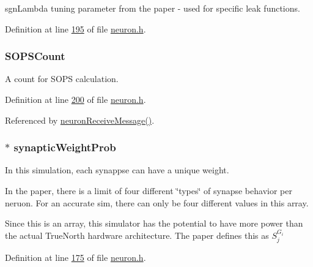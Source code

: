 sgn\+Lambda tuning parameter from the paper -\/ used for specific leak functions. 



Definition at line \hyperlink{neuron_8h_source_l00195}{195} of file \hyperlink{neuron_8h_source}{neuron.\+h}.

\hypertarget{structneuron_state_a71fbb9a79e8048b473b6e09d29a64bbe}{}
\subsubsection[{S\+O\+P\+S\+Count}]{ S\+O\+P\+S\+Count}\label{structneuron_state_a71fbb9a79e8048b473b6e09d29a64bbe}


A count for S\+O\+P\+S calculation. 



Definition at line \hyperlink{neuron_8h_source_l00200}{200} of file \hyperlink{neuron_8h_source}{neuron.\+h}.



Referenced by \hyperlink{neuron_8c_source_l00104}{neuron\+Receive\+Message()}.

\hypertarget{structneuron_state_af499000d57eeeaeeb6ee0928e1eee4f7}{}
\subsubsection[{synaptic\+Weight\+Prob}]{$\ast$ synaptic\+Weight\+Prob}\label{structneuron_state_af499000d57eeeaeeb6ee0928e1eee4f7}


In this simulation, each synappse can have a unique weight. 

In the paper, there is a limit of four different \char`\"{}types\char`\"{} of synapse behavior per neruon. For an accurate sim, there can only be four different values in this array.

Since this is an array, this simulator has the potential to have more power than the actual True\+North hardware architecture. The paper defines this as $S_j^{G_i}$ 

Definition at line \hyperlink{neuron_8h_source_l00175}{175} of file \hyperlink{neuron_8h_source}{neuron.\+h}.

